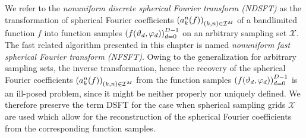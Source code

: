 We refer to the 
\emph{nonuniform discrete spherical Fourier transform (NDSFT)} as the 
transformation of spherical Fourier coefficients 
$\left(a_{k}^n{\hspace{-0.4ex}}\left(f\right)\right)_{(k,n) \in \mathcal{I}^M}$ 
of a bandlimited function $f$ into function samples 
$\left(f{\hspace{-0.4ex}}\left(\vartheta_{d},\varphi_{d}\right)\right)_{d=0}^{D-1}$ on an arbitrary sampling 
set $\mathcal{X}$. The fast related algorithm presented in this chapter is 
named \emph{nonuniform fast spherical 
Fourier transform (NFSFT)}. Owing to the generalization for arbitrary 
sampling sets, the inverse transformation, hence
the recovery of the spherical Fourier coefficients 
$\left(a_{k}^n{\hspace{-0.4ex}}\left(f\right)\right)_{(k,n) \in \mathcal{I}^M}$ from the function samples
$\left(f{\hspace{-0.4ex}}\left(\vartheta_{d},\varphi_{d}\right)\right)_{d=0}^{D-1}$ is an ill-posed problem, 
since it might be neither properly nor uniquely defined.
We therefore preserve the term DSFT for the case when 
spherical sampling grids $\mathcal{X}$ are used which allow for the 
reconstruction of the spherical Fourier coefficients from the corresponding 
function samples.


